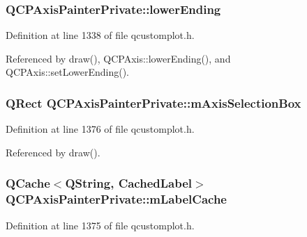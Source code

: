 \subsubsection[{lower\+Ending}]{ Q\+C\+P\+Axis\+Painter\+Private\+::lower\+Ending}\label{class_q_c_p_axis_painter_private_a077696dd1e7efb96e4c199f521433e24}


Definition at line 1338 of file qcustomplot.\+h.



Referenced by draw(), Q\+C\+P\+Axis\+::lower\+Ending(), and Q\+C\+P\+Axis\+::set\+Lower\+Ending().

\hypertarget{class_q_c_p_axis_painter_private_a9d7586f4923994488bdd006415b13f5f}{}
\subsubsection[{m\+Axis\+Selection\+Box}]{\setlength{\rightskip}{0pt plus 5cm}Q\+Rect Q\+C\+P\+Axis\+Painter\+Private\+::m\+Axis\+Selection\+Box\hspace{0.3cm}{\ttfamily [protected]}}\label{class_q_c_p_axis_painter_private_a9d7586f4923994488bdd006415b13f5f}


Definition at line 1376 of file qcustomplot.\+h.



Referenced by draw().

\hypertarget{class_q_c_p_axis_painter_private_a07ac270ea0c0ae084debd48d6a740e35}{}
\subsubsection[{m\+Label\+Cache}]{\setlength{\rightskip}{0pt plus 5cm}Q\+Cache$<$Q\+String, {\bf Cached\+Label}$>$ Q\+C\+P\+Axis\+Painter\+Private\+::m\+Label\+Cache\hspace{0.3cm}{\ttfamily [protected]}}\label{class_q_c_p_axis_painter_private_a07ac270ea0c0ae084debd48d6a740e35}


Definition at line 1375 of file qcustomplot.\+h.



